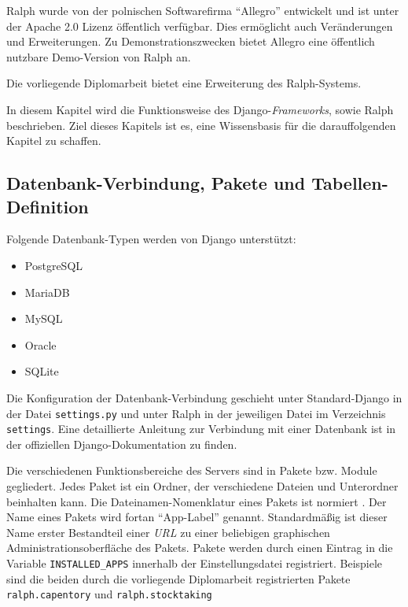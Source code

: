 Ralph wurde von der polnischen Softwarefirma ``Allegro'' entwickelt und
ist unter der Apache 2.0 Lizenz öffentlich verfügbar. Dies ermöglicht
auch Veränderungen und Erweiterungen. Zu Demonstrationszwecken bietet
Allegro eine öffentlich nutzbare Demo-Version \cite{ralph-demo} von
Ralph an.

Die vorliegende Diplomarbeit bietet eine Erweiterung des Ralph-Systems.

In diesem Kapitel wird die Funktionsweise des
Django-\emph{Frameworks},
sowie Ralph beschrieben. Ziel dieses Kapitels ist es, eine Wissensbasis
für die darauffolgenden Kapitel zu schaffen.

\hypertarget{datenbank-verbindung-pakete-und-tabellen-definition}{%
\subsection{Datenbank-Verbindung, Pakete und
Tabellen-Definition}\label{datenbank-verbindung-pakete-und-tabellen-definition}}

Folgende Datenbank-Typen werden von Django unterstützt:

\begin{itemize}
\tightlist
\item
  PostgreSQL
\item
  MariaDB
\item
  MySQL
\item
  Oracle
\item
  SQLite
\end{itemize}

Die Konfiguration der Datenbank-Verbindung geschieht unter
Standard-Django in der Datei \texttt{settings.py} und unter Ralph in der
jeweiligen Datei im Verzeichnis \texttt{settings}. Eine detaillierte
Anleitung zur Verbindung mit einer Datenbank ist in der offiziellen
Django-Dokumentation \cite{django-doku-db} zu finden.

Die verschiedenen Funktionsbereiche des Servers sind in Pakete bzw.
Module gegliedert. Jedes Paket ist ein Ordner, der verschiedene Dateien
und Unterordner beinhalten kann. Die Dateinamen-Nomenklatur eines Pakets
ist normiert \cite{django-file-nomenklatur}. Der Name eines Pakets wird
fortan ``App-Label'' genannt. Standardmäßig ist dieser Name erster
Bestandteil einer \emph{URL}
 zu einer beliebigen
graphischen Administrationsoberfläche des Pakets. Pakete werden durch
einen Eintrag in die Variable \texttt{INSTALLED\_APPS} innerhalb der
\oa{} Einstellungsdatei registriert. Beispiele sind die beiden durch die
vorliegende Diplomarbeit registrierten Pakete \texttt{ralph.capentory}
und \texttt{ralph.stocktaking}


